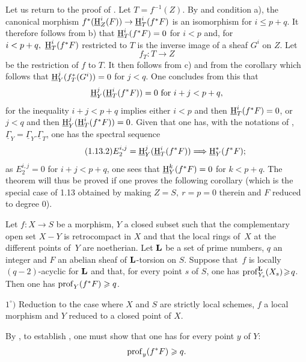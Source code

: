 Let us return to the proof of . Let $T=f^{-1}(Z)$. By  and condition a), the canonical morphism $f^*(\h_Z^i(F))\to\h_T^i(f^*F)$ is an isomorphism for $i\leq p+q$. It therefore follows from b) that $\operatorname{\underline{H}}^i_T(f^*F)=0$ for $i<p$ and, for $i<p+q, \ \operatorname{\underline{H}}^i_T(f^*F)$ restricted to $T$ is the inverse image of a sheaf $G^i$ on $Z$. Let
$$f_T:T\to Z$$
be the restriction of $f$ to $T$. It then follows from c) and from the corollary which follows that $\operatorname{\underline{H}}^j_Y(f^*_T(G^i))=0$ for $j<q$. One concludes from this that
$$
\operatorname{\underline{H}}^j_Y(\operatorname{\underline{H}}^i_T(f^*F))=0\text{ for } i+j<p+q,
$$
for the inequality $i+j<p+q$ implies either $i<p$ and then $\operatorname{\underline{H}}^i_T(f^*F)=0$, or $j<q$ and then $\operatorname{\underline{H}}_Y^j(\operatorname{\underline{H}}_T^i(f^*F))=0$. Given that one has, with the notations of , $\underline{\Gamma}_Y=\underline{\Gamma}_Y.\underline{\Gamma}_T$, one has the spectral sequence
\begin{equation*} \label{eq:XIV.1.13.2} \tag{1.13.2}
E_2^{i, j}=\h_Y^j(\h_T^i(f^*F))\To\h^*_Y(f^*F);
\end{equation*}
as $E_2^{i, j}=0$ for $i+j<p+q$, one sees that $\operatorname{\underline{H}}_Y^k(f^*F)=0$ for $k<p+q$. The theorem will thus be proved if one proves the following corollary (which is the special case of 1.13 obtained by making $Z=S, \ r=p=0$ therein and $F$ reduced to degree $0$).

\begin{corollary}\label{XIV.1.14}
Let $f:X\to S$ be a morphism, $Y$ a closed subset such that the complementary open set $X- Y$ is retrocompact in $X$ and that the local rings of~$X$ at the different points of~$Y$ are noetherian. Let $\mathbf{L}$ be a set of prime \hbox{numbers}, $q$ an integer and $F$ an abelian sheaf of $\mathbf{L}$-torsion on $S$. Suppose that~$f$ is locally $(q-2)$-acyclic for $\mathbf{L}$ and that, for every point $s$ of $S$, one has \hbox{$\operatorname{prof}_{Y_s}^{\mathbf{L}}(X_s)\!\geqslant\! q$}. Then one has $\operatorname{prof}_Y(f^*F)\geqslant q$.
\end{corollary}

$1^\circ)$ Reduction to the case where $X$ and $S$ are strictly local schemes, $f$ a local morphism and $Y$ reduced to a closed point of $X$.

By , to establish , one must show that one has for every point $y$ of $Y$:$$
\operatorname{prof}_y(f^*F)\geqslant q.
$$

